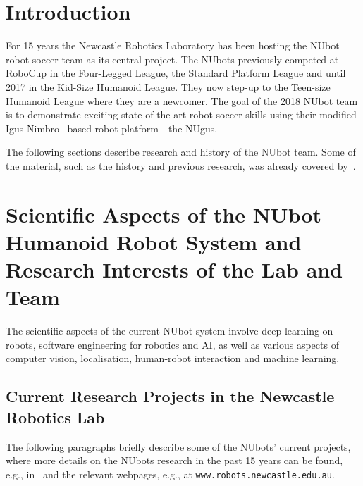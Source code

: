 \documentclass{llncs}
\begin{document}
%
\section{Introduction}
For 15 years the Newcastle Robotics Laboratory has been hosting the NUbot robot soccer team as its central project. The NUbots previously competed at RoboCup in the Four-Legged League, the Standard Platform League and until 2017 in the Kid-Size Humanoid League. They now step-up to the Teen-size Humanoid League where they are a newcomer. The goal of the 2018 NUbot team is to demonstrate exciting state-of-the-art robot soccer skills using their modified Igus-Nimbro~\cite{allgeuer2016igus} based robot platform---the NUgus.  

The following sections describe research and history of the NUbot team. Some of the material, such as the history and previous research, was already covered by~\cite{AmosEtAl2017}.


\section{Scientific Aspects of the NUbot Humanoid Robot System and  Research Interests of the Lab and Team}
 
The scientific aspects of the current NUbot system involve deep learning on robots, software engineering for robotics and AI, as well as various aspects of computer vision, localisation, human-robot interaction  and machine learning.

\subsection{Current Research Projects in the Newcastle Robotics Lab}
The following paragraphs briefly describe some of the NUbots' current projects, where more details on the NUbots research in the past 15 years can be found, e.g., in~\cite{AmosEtAl2017} and the relevant webpages, e.g., at
\texttt{www.robots.newcastle.edu.au}.\\
\end{document}

